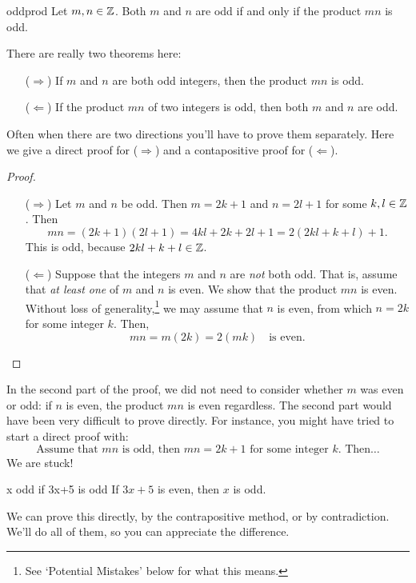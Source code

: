 \begin{thm}{}{oddprod}
Let $m,n\in\mathbb{Z}$. Both $m$ and $n$ are odd if and only if the product $mn$ is odd.
\end{thm}

 There are really two theorems here:
\begin{itemize}
\item[]{($\Rightarrow$)} If $m$ and $n$ are both odd integers, then the product $mn$ is odd.
\item[]{($\Leftarrow$)} If the product $mn$ of two integers is odd, then both $m$ and $n$ are odd.
 \end{itemize}
 
 Often when there are two directions you'll have to prove them separately. Here we give a direct proof for ($\Rightarrow$) and a contapositive proof for ($\Leftarrow$).

\begin{proof}
\begin{enumerate}
  \item[($\Rightarrow$)] Let $m$ and $n$ be odd. Then $m=2k+1$ and $n=2l+1$ for some $k,l\in\mathbb{Z}$. Then
  \[mn=(2k+1)(2l+1)=4kl+2k+2l+1=2(2kl+k+l)+1.\]
  This is odd, because $2kl+k+l\in\mathbb{Z}$.
  \item[($\Leftarrow$)] Suppose that the integers $m$ and $n$ are \emph{not} both odd. That is, assume that \emph{at least one} of $m$ and $n$ is even. We show that the product $mn$ is even. Without loss of generality,\footnote{See `Potential Mistakes' below for what this means.} we may assume that $n$ is even, from which $n=2k$ for some integer $k$. Then,
  \[mn=m(2k)=2(mk)\quad\text{is even}.\tag*{\qedhere}\]
\end{enumerate}
\end{proof}

 In the second part of the proof, we did not need to consider whether $m$ was even or odd: if $n$ is even, the product $mn$ is even regardless. The second part would have been very difficult to prove directly. For instance, you might have tried to start a direct proof with:
\[\text{Assume that $mn$ is odd, then $mn=2k+1$ for some integer $k$. Then\ldots}\]
We are stuck!

\begin{thm}{}{x odd if 3x+5 is odd}
If $3x+5$ is even, then $x$ is odd.
\end{thm}

We can prove this directly, by the contrapositive method, or by contradiction. We'll do all of them, so you can appreciate the difference. 

